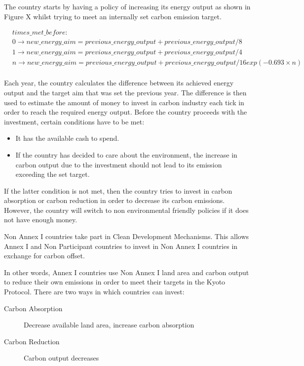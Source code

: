 The country starts by having a policy of increasing its energy output as shown in Figure X whilst trying to meet an internally set carbon emission target.

\begin{align*}
	&times\_met\_before: \\
	&0 \rightarrow new\_energy\_aim = previous\_energy\_output + previous\_energy\_output / 8\\
	&1 \rightarrow new\_energy\_aim = previous\_energy\_output + previous\_energy\_output / 4\\
	&n \rightarrow new\_energy\_aim = previous\_energy\_output + previous\_energy\_output / 16exp(-0.693 \times n)\\
\end{align*}

Each year, the country calculates the difference between its achieved energy output and the target aim that was set the previous year. The difference is then used to estimate the amount of money to invest in carbon industry each tick in order to reach the required energy output. Before the country proceeds with the investment, certain conditions have to be met:

\begin{itemize}
	\item It has the available cash to spend.
	\item If the country has decided to care about the environment, the increase in carbon output due to the investment should not lead to its emission exceeding the set target.
\end{itemize}

If the latter condition is not met, then the country tries to invest in carbon absorption or carbon reduction in order to decrease its carbon emissions. However, the country will switch to non environmental friendly policies if it does not have enough money.
 
Non Annex I countries take part in Clean Development Mechanisms. This allows Annex I and Non Participant countries to invest in Non Annex I countries in exchange for carbon offset.

In other words, Annex I countries use Non Annex I land area and carbon output to reduce their own emissions in order to meet their targets in the Kyoto Protocol. There are two ways in which countries can invest:
 
\begin{description}
	\item[Carbon Absorption] Decrease available land area, increase carbon absorption
	\item[Carbon Reduction] Carbon output decreases
\end{description}
 
